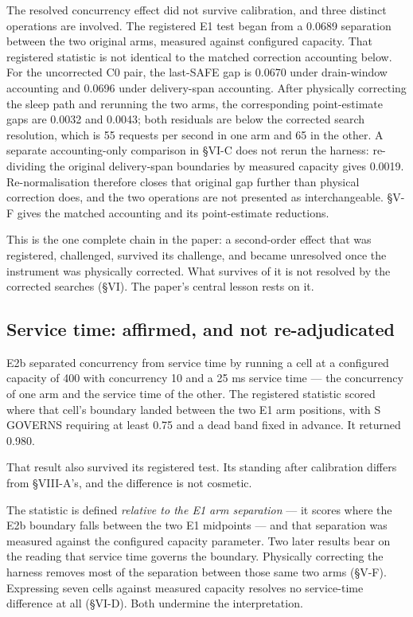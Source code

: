 \documentclass{ieeeaccess}
\begin{document}
The resolved concurrency effect did not survive calibration, and three distinct operations are involved. The registered E1 test began from a 0.0689 separation between the two original arms, measured against configured capacity. That registered statistic is not identical to the matched correction accounting below. For the uncorrected C0 pair, the last-SAFE gap is 0.0670 under drain-window accounting and 0.0696 under delivery-span accounting. After physically correcting the sleep path and rerunning the two arms, the corresponding point-estimate gaps are 0.0032 and 0.0043; both residuals are below the corrected search resolution, which is 55 requests per second in one arm and 65 in the other. A separate accounting-only comparison in \S{}VI-C does not rerun the harness: re-dividing the original delivery-span boundaries by measured capacity gives 0.0019. Re-normalisation therefore closes that original gap further than physical correction does, and the two operations are not presented as interchangeable. \S{}V-F gives the matched accounting and its point-estimate reductions.

This is the one complete chain in the paper: a second-order effect that was registered, challenged, survived its challenge, and became unresolved once the instrument was physically corrected. What survives of it is not resolved by the corrected searches (\S{}VI). The paper's central lesson rests on it.

\subsection{Service time: affirmed, and not re-adjudicated}

E2b separated concurrency from service time by running a cell at a configured capacity of 400 with concurrency 10 and a 25 ms service time --- the concurrency of one arm and the service time of the other. The registered statistic scored where that cell's boundary landed between the two E1 arm positions, with S GOVERNS requiring at least 0.75 and a dead band fixed in advance. It returned 0.980.

That result also survived its registered test. Its standing after calibration differs from \S{}VIII-A's, and the difference is not cosmetic.

The statistic is defined \textit{relative to the E1 arm separation} --- it scores where the E2b boundary falls between the two E1 midpoints --- and that separation was measured against the configured capacity parameter. Two later results bear on the reading that service time governs the boundary. Physically correcting the harness removes most of the separation between those same two arms (\S{}V-F). Expressing seven cells against measured capacity resolves no service-time difference at all (\S{}VI-D). Both undermine the interpretation.
\end{document}
